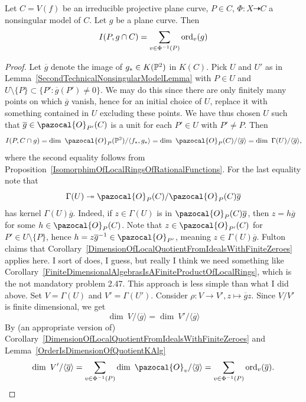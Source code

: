     \begin{proposition}\label{IntersectionFormula}
        Let $C=V(f)$ be an irreducible projective plane curve, $P\in C$, $\Phi: X\dashrightarrow C$ a nonsingular model of $C$. Let $g$ be a plane curve. Then 
        $$
            I(P,g\cap C) = \sum_{v\in \Phi^{-1}(P)} \mathrm{ord}_v(g)
        $$
    \end{proposition}
    \begin{proof}
        Let $\overline{g}$ denote the image of $g_\ast\in K(\mathbb{P}^2)$ in $K(C)$. Pick $U$ and $U'$ as in Lemma~\ref{SecondTechnicalNonsingularModelLemma} with $P\in U$ and $U\setminus \{P\}\subset \{P':\overline{g}(P')\neq 0\}$. We may do this since there are only finitely many points on which $\overline{g}$ vanish, hence for an initial choice of $U$, replace it with something contained in $U$ excluding these points. We have thus chosen $U$ such that $\overline{g}\in \pazocal{O}_{P'}(C)$ is a unit for each $P'\in U$ with $P'\neq P$. Then 
        \begin{align*}
            I(P,C\cap g)=\dim \ \pazocal{O}_P(\Pp^2)/\langle f_\ast, g_\ast\rangle = \dim\ \pazocal{O}_P(C)/\langle \overline{g}\rangle = \dim \ \Gamma(U)/\langle \overline{g}\rangle,
        \end{align*}
        where the second equality follows from Proposition~\ref{IsomorphimOfLocalRingsOfRationalFunctions}. For the last equality note that 
        $$
            \Gamma(U) \twoheadrightarrow \pazocal{O}_P(C)/\pazocal{O}_P(C)\overline{g}
        $$
        has kernel $\Gamma(U) \overline{g}$. Indeed, if $z\in \Gamma(U)$ is in  $\pazocal{O}_P(C) \overline{g}$, then $z= h\overline{g}$ for some $h\in \pazocal{O}_P(C)$. Note that $z\in \pazocal{O}_{P'}(C)$ for $P' \in U\setminus \{P\}$, hence $h = z\overline{g}^{-1} \in \pazocal{O}_{P'}$, meaning $z\in \Gamma(U)\overline{g}$. {\large Fulton claims that Corollary~\ref{DimensionOfLocalQuotientFromIdealsWithFiniteZeroes} applies here. I sort of does, I guess, but really I think we need something like Corollary~\ref{FiniteDimensionalAlgebrasIsAFiniteProductOfLocalRings}, which is the not mandatory problem 2.47. This approach is less simple than what I did above.}
        Set $V= \Gamma(U)$ and $V'=\Gamma(U')$. Consider $\rho : V\rightarrow V', z\mapsto \overline{g}z$.
        Since $V/V'$ is finite dimensional, we get 
        $$
            \dim \ V/\langle \overline{g}\rangle = \dim \ V'/\langle \overline{g}\rangle 
        $$
        By (an appropriate version of) Corollary~\ref{DimensionOfLocalQuotientFromIdealsWithFiniteZeroes} and Lemma~\ref{OrderIsDimensionOfQuotientKAlg}
        $$
            \dim \ V'/\langle \overline{g}\rangle = \sum_{v\in \Phi^{-1}(P)} \dim\ \pazocal{O}_v/\langle \overline{g}\rangle = \sum_{v\in \Phi^{-1}(P)} \ord_v(\overline{g}).
        $$
    \end{proof}

